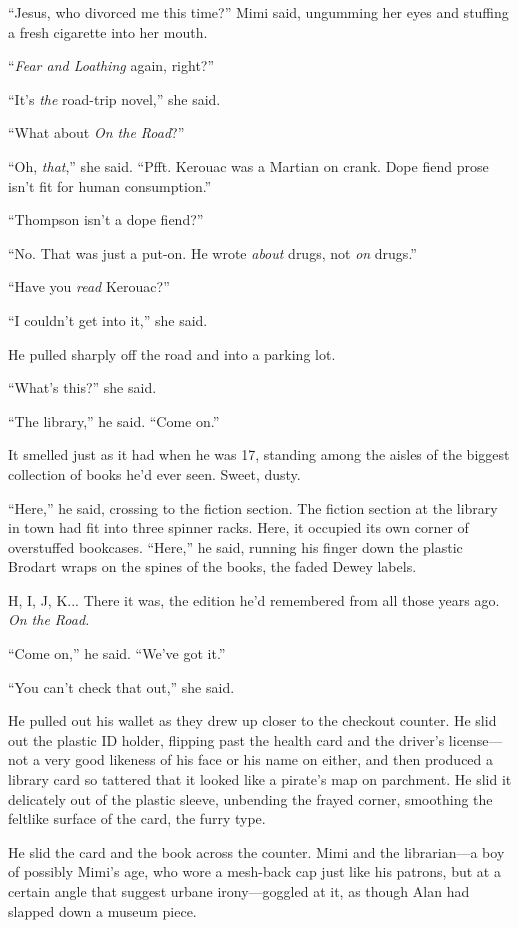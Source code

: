 \documentclass{article}
\begin{document}
``Jesus, who divorced me this time?'' Mimi said, ungumming her eyes
and stuffing a fresh cigarette into her mouth.

``\textit{Fear and Loathing} again, right?''

``It's \textit{the} road-trip novel,'' she said.

``What about \textit{On the Road}?''

``Oh, \textit{that},'' she said.  ``Pfft.  Kerouac was a Martian on
crank.  Dope fiend prose isn't fit for human consumption.''

``Thompson isn't a dope fiend?''

``No.  That was just a put-on.  He wrote \textit{about} drugs, not
\textit{on} drugs.''

``Have you \textit{read} Kerouac?''

``I couldn't get into it,'' she said.

He pulled sharply off the road and into a parking lot.

``What's this?'' she said.

``The library,'' he said.  ``Come on.''

It smelled just as it had when he was 17, standing among the aisles of
the biggest collection of books he'd ever seen.  Sweet, dusty.

``Here,'' he said, crossing to the fiction section.  The fiction
section at the library in town had fit into three spinner racks. 
Here, it occupied its own corner of overstuffed bookcases.  ``Here,''
he said, running his finger down the plastic Brodart wraps on the
spines of the books, the faded Dewey labels.

H, I, J, K...  There it was, the edition he'd remembered from all
those years ago.  \textit{On the Road.}

``Come on,'' he said.  ``We've got it.''

``You can't check that out,'' she said.

He pulled out his wallet as they drew up closer to the checkout
counter.  He slid out the plastic ID holder, flipping past the health
card and the driver's license---not a very good likeness of his face
or his name on either, and then produced a library card so tattered
that it looked like a pirate's map on parchment.  He slid it
delicately out of the plastic sleeve, unbending the frayed corner,
smoothing the feltlike surface of the card, the furry type.

He slid the card and the book across the counter.  Mimi and the
librarian---a boy of possibly Mimi's age, who wore a mesh-back cap
just like his patrons, but at a certain angle that suggest urbane
irony---goggled at it, as though Alan had slapped down a museum piece.
\end{document}
